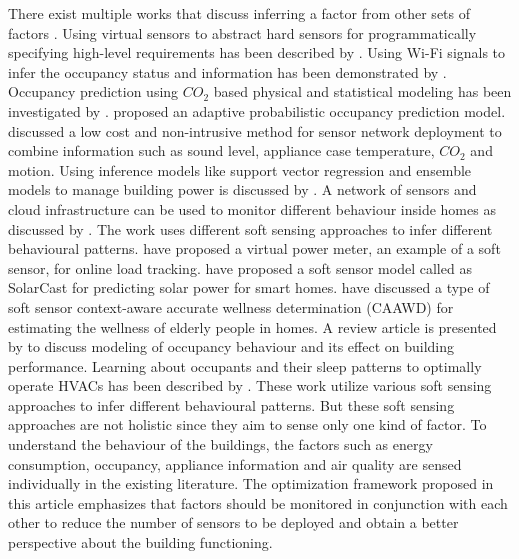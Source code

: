 There exist multiple works that discuss inferring a factor from other sets of factors \citep{anshuleEnergy16, balaji}.   
Using virtual sensors to abstract hard sensors for programmatically specifying high-level requirements has been described by \cite{virtual_senors}.   
Using Wi-Fi signals to infer the occupancy status and information has been demonstrated by \cite{occupancy_wifi, softgreen}.
Occupancy prediction using $CO_2$ based physical and statistical modeling has been investigated by \cite{elsevier_co2}. 
\cite{elsevier_occ_realtime}  proposed an adaptive probabilistic occupancy prediction model.
\cite{brown_fan}  discussed a low cost and non-intrusive method for sensor network deployment to combine information such as sound level, appliance case temperature, $CO_2$ and motion.
Using inference models like support vector regression and ensemble models to manage building power is discussed by \cite{tcps_bellala}.  
A network of sensors and cloud infrastructure can be used to monitor different behaviour inside homes as discussed by \cite{sensors_cloud_behaviour}. 
The work uses different soft sensing approaches to infer different behavioural patterns.
\cite{tcps_virtualpowermeter} have proposed a virtual power meter, an example of a soft sensor, for online load tracking.  
\cite{tcps_solarcast} have proposed a soft sensor model called as SolarCast for predicting solar power for smart homes.  
\cite{sensors_caawd} have discussed a type of soft sensor {context-aware accurate	wellness determination (CAAWD)} for estimating the wellness of elderly people in homes. 
A review article  is presented by \cite{scs_ob} to discuss modeling of occupancy behaviour and its effect on building performance.
Learning about occupants and their sleep patterns to optimally operate HVACs has been described by \cite{lu}. 
These work utilize various soft sensing approaches to infer different behavioural patterns.
But these soft sensing approaches are not holistic since they aim to sense only one kind of factor.  
To understand the behaviour of the buildings, the factors such as energy  consumption, occupancy, appliance information and air quality are sensed individually in the existing literature.
The optimization framework proposed in this article emphasizes that factors should be monitored in conjunction with each other to reduce the number of sensors to be deployed and obtain a better perspective about the building functioning.

